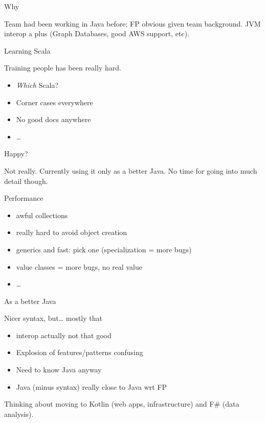 \documentclass[notheorems,14pt,compress]{beamer}
\providecommand{\tightlist}{%
\setlength{\itemsep}{0pt}\setlength{\parskip}{0pt}}
\theoremstyle{definition}
\begin{document}
\begin{frame}{%
\protect\hypertarget{why}{%
Why}}

Team had been working in Java before; FP obvious given team background.
JVM interop a plus (Graph Databases, good AWS support, etc).

\end{frame}

\begin{frame}{%
\protect\hypertarget{learning-scala}{%
Learning Scala}}

Training people has been really hard.

\begin{itemize}
\tightlist
\item
  \emph{Which} Scala?
\item
  Corner cases everywhere
\item
  No good docs anywhere
\item
  \ldots{}
\end{itemize}

\end{frame}

\begin{frame}{%
\protect\hypertarget{happy}{%
Happy?}}

Not really. Currently using it only as a better Java. No time for going
into much detail though.

\end{frame}

\begin{frame}{%
\protect\hypertarget{performance}{%
Performance}}

\begin{itemize}
\tightlist
\item
  awful collections
\item
  really hard to avoid object creation
\item
  generics and fast: pick one (specialization = more bugs)
\item
  value classes = more bugs, no real value
\item
  \ldots{}
\end{itemize}

\end{frame}

\begin{frame}{%
\protect\hypertarget{as-a-better-java}{%
As a better Java}}

Nicer syntax, but\ldots{} mostly that

\begin{itemize}
\tightlist
\item
  interop actually not that good
\item
  Explosion of features/patterns confusing
\item
  Need to know Java anyway
\item
  Java (minus syntax) really close to Java wrt FP
\end{itemize}

Thinking about moving to Kotlin (web apps, infrastructure) and F\# (data
analysis).

\end{frame}
\end{document}
